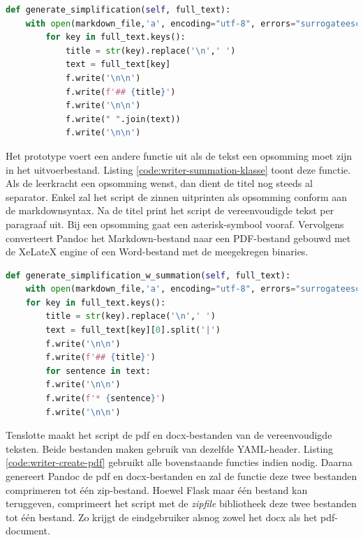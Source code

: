 \begin{lstlisting}[language=Python, caption={Een doorlopende tekst toevoegen aan het markdownbestand met de Writer-klasse.}, label={code:writer-doorlopende-klasse}]
def generate_simplification(self, full_text):
	with open(markdown_file,'a', encoding="utf-8", errors="surrogateescape") as f:
		for key in full_text.keys():
			title = str(key).replace('\n',' ')
			text = full_text[key]
			f.write('\n\n')
			f.write(f'## {title}')
			f.write('\n\n')
			f.write(" ".join(text))
			f.write('\n\n')
\end{lstlisting}

Het prototype voert een andere functie uit als de tekst een opsomming moet zijn in het uitvoerbestand. Listing \ref{code:writer-summation-klasse} toont deze functie. Als de leerkracht een opsomming wenst, dan dient de titel nog steeds al separator. Enkel zal het script de zinnen uitprinten als opsomming conform aan de markdownsyntax. Na de titel print het script de vereenvoudigde tekst per paragraaf uit. Bij een opsomming gaat een asterisk-symbool vooraf. Vervolgens converteert Pandoc het Markdown-bestand naar een PDF-bestand gebouwd met de XeLateX engine of een Word-bestand met de meegekregen binaries. 

\begin{lstlisting}[language=Python, caption={Een opsomming toevoegen aan het markdownbestand met de Writer-klasse.}, label={code:writer-summation-klasse}]
def generate_simplification_w_summation(self, full_text):
	with open(markdown_file,'a', encoding="utf-8", errors="surrogateescape") as f:
	for key in full_text.keys():
		title = str(key).replace('\n',' ')
		text = full_text[key][0].split('|')
		f.write('\n\n')
		f.write(f'## {title}')
		for sentence in text:    
		f.write('\n\n')
		f.write(f'* {sentence}')
		f.write('\n\n')
\end{lstlisting}

Tenslotte maakt het script de pdf en docx-bestanden van de vereenvoudigde teksten. Beide bestanden maken gebruik van dezelfde YAML-header. Listing \ref{code:writer-create-pdf} gebruikt alle bovenstaande functies indien nodig. Daarna genereert Pandoc de pdf en docx-bestanden en zal de functie deze twee bestanden comprimeren tot één zip-bestand. Hoewel Flask maar één bestand kan teruggeven, comprimeert het script met de \textit{zipfile} bibliotheek deze twee bestanden tot één bestand. Zo krijgt de eindgebruiker alsnog zowel het docx als het pdf-document. 

